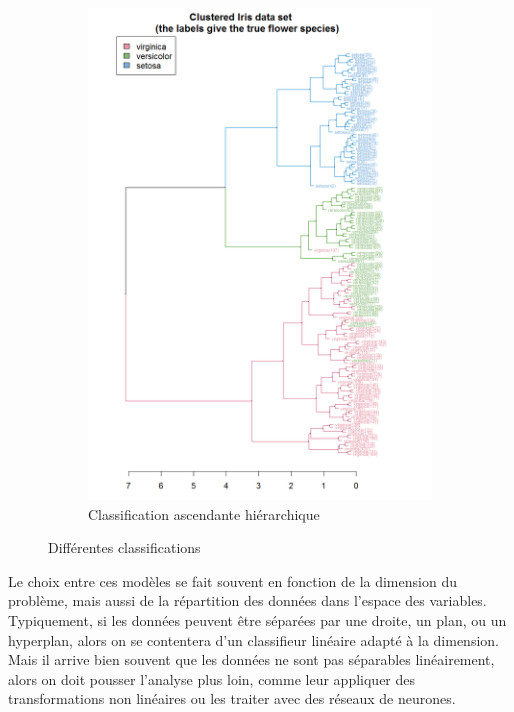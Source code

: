 \begin{figure}
\begin{subfigure}[b]{0.45\textwidth}
        \includegraphics[width=\textwidth]{img/iris_dendrogram.png}
        \caption{Classification ascendante hiérarchique}
    \end{subfigure}
    \caption{Différentes classifications}\label{fig:clusterings}
\end{figure}

Le choix entre ces modèles se fait souvent en fonction de la dimension du problème, mais aussi de la répartition des données dans l'espace des variables. Typiquement, si les données peuvent être séparées par une droite, un plan, ou un hyperplan, alors on se contentera d'un classifieur linéaire adapté à la dimension. Mais il arrive bien souvent que les données ne sont pas séparables linéairement, alors on doit pousser l'analyse plus loin, comme leur appliquer des transformations non linéaires ou les traiter avec des réseaux de neurones.


